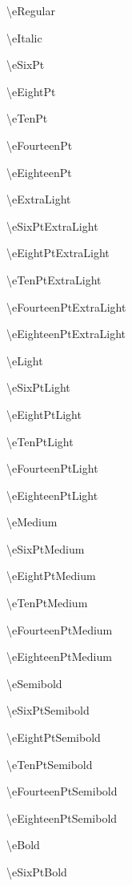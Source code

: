 \documentclass[12pt]{article}
\begin{document}
\begin{multicols}{2}
\small\noindent\textbackslash eRegular

\noindent\textbackslash eItalic

\noindent\textbackslash eSixPt

\noindent\textbackslash eEightPt

\noindent\textbackslash eTenPt

\noindent\textbackslash eFourteenPt

\noindent\textbackslash eEighteenPt

\noindent\textbackslash eExtraLight

\noindent\textbackslash eSixPtExtraLight

\noindent\textbackslash eEightPtExtraLight

\noindent\textbackslash eTenPtExtraLight

\noindent\textbackslash eFourteenPtExtraLight

\noindent\textbackslash eEighteenPtExtraLight

\noindent\textbackslash eLight

\noindent\textbackslash eSixPtLight

\noindent\textbackslash eEightPtLight

\noindent\textbackslash eTenPtLight

\noindent\textbackslash eFourteenPtLight

\noindent\textbackslash eEighteenPtLight

\noindent\textbackslash eMedium

\noindent\textbackslash eSixPtMedium

\noindent\textbackslash eEightPtMedium

\noindent\textbackslash eTenPtMedium

\noindent\textbackslash eFourteenPtMedium

\noindent\textbackslash eEighteenPtMedium

\noindent\textbackslash eSemibold

\noindent\textbackslash eSixPtSemibold

\noindent\textbackslash eEightPtSemibold

\noindent\textbackslash eTenPtSemibold

\noindent\textbackslash eFourteenPtSemibold

\noindent\textbackslash eEighteenPtSemibold

\noindent\textbackslash eBold

\noindent\textbackslash eSixPtBold


\end{multicols}
\end{document}
